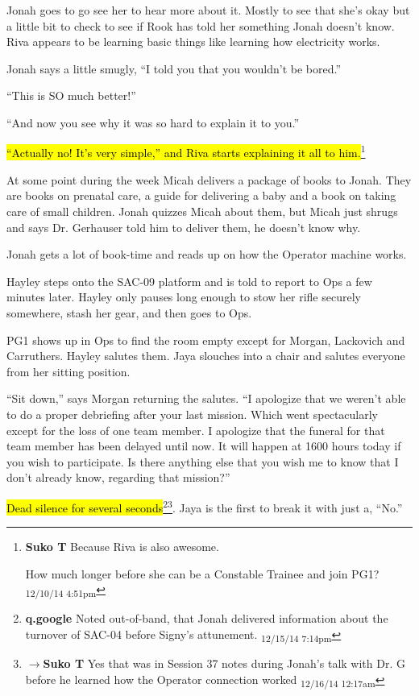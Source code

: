 Jonah goes to go see her to hear more about it. Mostly to see that she's okay but a little bit to check to see if Rook has told her something Jonah doesn't know.  Riva appears to be learning basic things like learning how electricity works.

Jonah says a little smugly, ``I told you that you wouldn't be bored.''

``This is SO much better!''

``And now you see why it was so hard to explain it to you.''

\hl{``Actually no!  It's very simple,'' and Riva starts explaining it all to him.}\footnote{\textbf{Suko T }Because Riva is also awesome.

How much longer before she can be a Constable Trainee and join PG1? \textsubscript{12/10/14 4:51pm}}



At some point during the week Micah delivers a package of books to Jonah.  They are books on prenatal care, a guide for delivering a baby and a book on taking care of small children.  Jonah quizzes Micah about them, but Micah just shrugs and says Dr. Gerhauser told him to deliver them, he doesn't know why.



Jonah gets a lot of book-time and reads up on how the Operator machine works.





Hayley steps onto the SAC-09 platform and is told to report to Ops a few minutes later.  Hayley only pauses long enough to stow her rifle securely somewhere, stash her gear, and then goes to Ops.



PG1 shows up in Ops to find the room empty except for Morgan, Lackovich and Carruthers.  Hayley salutes them.   Jaya slouches into a chair and salutes everyone from her sitting position.

``Sit down,'' says Morgan returning the salutes.  ``I apologize that we weren't able to do a proper debriefing after your last mission.  Which went spectacularly except for the loss of one team member.  I apologize that the funeral for that team member has been delayed until now.  It will happen at 1600 hours today if you wish to participate.  Is there anything else that you wish me to know that I don't already know, regarding that mission?''

\hl{Dead silence for several seconds}\footnote{\textbf{q.google }Noted out-of-band, that Jonah delivered information about the turnover of SAC-04 before Signy's attunement. \textsubscript{12/15/14 7:14pm}}\footnote{$\rightarrow$\textbf{Suko T }Yes that was in Session 37 notes during Jonah's talk with Dr. G before he learned how the Operator connection worked \textsubscript{12/16/14 12:17am}}.  Jaya is the first to break it with just a, ``No.''

